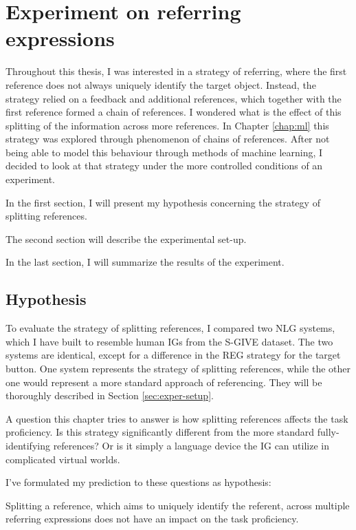 \chapter{Experiment on referring expressions}
\label{chap:exper}
Throughout this thesis, I was interested in a strategy of referring, where the first reference does not always uniquely identify the target object. Instead, the strategy relied on a feedback and additional references, which together with the first reference formed a chain of references. I wondered what is the effect of this splitting of the information across more references. In Chapter \ref{chap:ml} this strategy was explored through phenomenon of chains of references. After not being able to model this behaviour through methods of machine learning, I decided to look at that strategy under the more controlled conditions of an experiment.

In the first section, I will present my hypothesis concerning the strategy of splitting references. 

The second section will describe the experimental set-up. 

In the last section, I will summarize the results of the experiment.

\section{Hypothesis}
To evaluate the strategy of splitting references, I compared two NLG systems, which I have built to resemble human IGs from the S-GIVE dataset. The two systems are identical, except for a difference in the REG strategy for the target button. One system represents the strategy of splitting references, while the other one would represent a more standard approach of referencing. They will be thoroughly described in Section \ref{sec:exper-setup}.

A question this chapter tries to answer is how splitting references affects the task proficiency. Is this strategy significantly different from the more standard fully-identifying references? Or is it simply a language device the IG can utilize in complicated virtual worlds.

I've formulated my prediction to these questions as hypothesis:

\begin{hypo*}
Splitting a reference, which aims to uniquely identify the referent, across multiple referring expressions does not have an impact on the task proficiency.
\end{hypo*}

